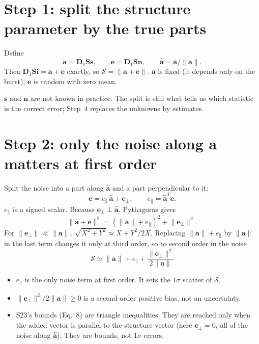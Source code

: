 \documentclass[11pt]{article}
\newcommand{\vb}[1]{\boldsymbol{#1}}
\newcommand{\Dn}{\vb D_1}
\newcommand{\Sm}{\vb S}
\newcommand{\ah}{\hat{\vb a}}
\newcommand{\nrm}[1]{\lVert #1\rVert}
\newcommand{\na}{\nrm{\vb a}}
\newcommand{\Sc}{\mathcal S}
\newcommand{\ep}{e_\parallel}
\newcommand{\eperp}{\vb e_\perp}
\begin{document}
\section*{Step 1: split the structure parameter by the true parts}

Define
\begin{equation}
\vb a=\Dn\Sm\vb s,\qquad \vb e=\Dn\Sm\vb n,\qquad \ah=\vb a/\na .
\end{equation}
Then $\Dn\Sm\vb i=\vb a+\vb e$ exactly, so $\Sc=\nrm{\vb a+\vb e}$. $\vb a$ is fixed (it depends only on the
burst); $\vb e$ is random with zero mean.

$\vb s$ and $\vb n$ are not known in practice. The split is still what tells us which statistic is the correct
error; Step~4 replaces the unknowns by estimates.

\section*{Step 2: only the noise along $\vb a$ matters at first order}

Split the noise into a part along $\ah$ and a part perpendicular to it:
\begin{equation}
\vb e=\ep\,\ah+\eperp,\qquad \ep=\ah^{T}\vb e .
\end{equation}
$\ep$ is a signed scalar. Because $\eperp\perp\ah$, Pythagoras gives
\begin{equation}
\nrm{\vb a+\vb e}^{2}=(\na+\ep)^{2}+\nrm{\eperp}^{2}.
\end{equation}
For $\nrm{\eperp}\ll\na$, $\sqrt{X^{2}+Y^{2}}\simeq X+Y^{2}/2X$. Replacing $\na+\ep$ by $\na$ in the last term
changes it only at third order, so to second order in the noise
\begin{equation}
\boxed{\;\Sc\simeq\na+\ep+\frac{\nrm{\eperp}^{2}}{2\na}\;}
\label{eq:S}
\end{equation}
\begin{itemize}
\item $\ep$ is the only noise term at first order. It sets the $1\sigma$ scatter of $\Sc$.
\item $\nrm{\eperp}^{2}/2\na\ge0$ is a second-order positive bias, not an uncertainty.
\item S23's bounds (Eq.~8) are triangle inequalities. They are reached only when the added vector is
parallel to the structure vector (here $\eperp=0$, all of the noise along $\ah$). They are bounds, not $1\sigma$ errors.
\end{itemize}
\end{document}
